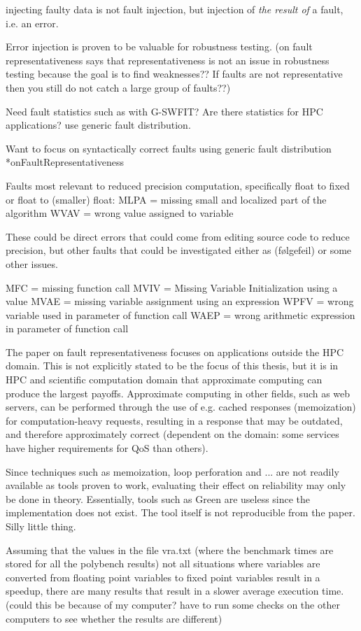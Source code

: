 injecting faulty data is not fault injection, but injection of \textit{the result of} a fault, i.e. an error.

Error injection is proven to be valuable for robustness testing. (on fault representativeness says that representativeness is not an issue in robustness testing because the goal is to find weaknesses?? If faults are not representative then you still do not catch a large group of faults??)

Need fault statistics such as with G-SWFIT? Are there statistics for HPC applications? use generic fault distribution. 

Want to focus on syntactically correct faults using generic fault distribution *onFaultRepresentativeness

Faults most relevant to reduced precision computation, specifically float to fixed or float to (smaller) float:
MLPA = missing small and localized part of the algorithm
WVAV = wrong value assigned to variable

These could be direct errors that could come from editing source code to reduce precision, but other faults that could be investigated either as (følgefeil) or some other issues. 

MFC = missing function call
MVIV = Missing Variable Initialization using a value
MVAE = missing variable assignment using an expression
WPFV = wrong variable used in parameter of function call
WAEP = wrong arithmetic expression in parameter of function call


The paper on fault representativeness focuses on applications outside the HPC domain. This is not explicitly stated to be the focus of this thesis, but it is in HPC and scientific computation domain that approximate computing can produce the largest payoffs. Approximate computing in other fields, such as web servers, can be performed through the use of e.g. cached responses (memoization) for computation-heavy requests, resulting in a response that may be outdated, and therefore approximately correct (dependent on the domain: some services have higher requirements for QoS than others). 

Since techniques such as memoization, loop perforation and ... are not readily available as tools proven to work, evaluating their effect on reliability may only be done in theory. Essentially, tools such as Green are useless since the implementation does not exist. The tool itself is not reproducible from the paper. Silly little thing. 


Assuming that the values in the file vra.txt (where the benchmark times are stored for all the polybench results) not all situations where variables are converted from floating point variables to fixed point variables result in a speedup, there are many results that result in a slower average execution time. (could this be because of my computer? have to run some checks on the other computers to see whether the results are different)


